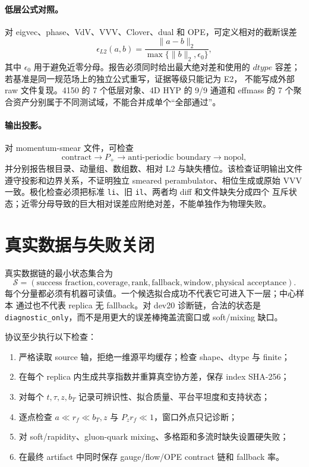 \paragraph{低层公式对照。}
对 eigvec、phase、VdV、VVV、Clover、dual 和 OPE，可定义相对的截断误差
\begin{equation}
  \epsilon_{L2}(a,b)=\frac{\lVert a-b\rVert_2}
  {\max\{\lVert b\rVert_2,\epsilon_0\}},
  \label{eq:b08-relative-l2}
\end{equation}
其中 \(\epsilon_0\) 用于避免近零分母。报告必须同时给出最大绝对差和使用的
\(dtype\) 容差；若基准是同一规范场上的独立公式重写，证据等级只能记为 E2，
不能写成外部 raw 文件复现。4150 的 7 个低层对象、4D HYP 的 9/9 通道和
effmass 的 7 个聚合资产分别属于不同测试域，不能合并成单个“全部通过”。

\paragraph{输出投影。}
对 momentum-smear 文件，可检查
\begin{equation}
  \text{contract}\longrightarrow P_+\longrightarrow
  \text{anti-periodic boundary}\longrightarrow \text{nopol},
  \label{eq:b08-output-projection}
\end{equation}
并分别报告根目录、动量组、数组数、相对 L2 与缺失槽位。该检查证明输出文件
遵守投影和边界关系，不证明独立 smeared perambulator、相位生成或原始
VVV 一致。极化检查必须把标准 \texttt{li}、旧 \texttt{il}、两者均 diff 和文件缺失分成四个
互斥状态；近零分母导致的巨大相对误差应附绝对差，不能单独作为物理失败。

\section{真实数据与失败关闭}

真实数据链的最小状态集合为
\begin{equation}
  \mathcal S=
  (\text{success fraction},\text{coverage},\text{rank},
  \text{fallback},\text{window},\text{physical acceptance}).
  \label{eq:b08-state-vector}
\end{equation}
每个分量都必须有机器可读值。一个候选拟合成功不代表它可进入下一层；中心样本
通过也不代表 replica 无 fallback。对 dev20 诊断链，合法的状态是
\texttt{diagnostic\_only}，而不是用更大的误差棒掩盖流窗口或 soft/mixing 缺口。

协议至少执行以下检查：
\begin{enumerate}
  \item 严格读取 source 轴，拒绝一维源平均缓存；检查 shape、dtype 与 finite；
  \item 在每个 replica 内生成共享指数并重算真空协方差，保存 index SHA-256；
  \item 对每个 \(t,\tau,z,b_T\) 记录可辨识性、拟合质量、平台平坦度和支持状态；
  \item 逐点检查 \(a\ll r_f\ll b_T,z\) 与 \(P_zr_f\ll1\)，窗口外点只记诊断；
  \item 对 soft/rapidity、gluon-quark mixing、多格距和多流时缺失设置硬失败；
  \item 在最终 artifact 中同时保存 gauge/flow/OPE contract 链和 fallback 率。
\end{enumerate}

